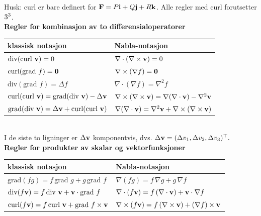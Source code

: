 Husk: curl er bare definert for $\mathbf{F}=P\mathbf{i}+Q\mathbf{j}+R\mathbf{k}$. Alle regler med curl forutsetter $3^3$.\\[1.25em]
\textbf{Regler for kombinasjon av to differensialoperatorer}\\[.25em]

\renewcommand{\arraystretch}{1.5}
\begin{tabular}{|l|l|}
\hline
 \textbf{klassisk notasjon} & \textbf{Nabla-notasjon} \\
\hline
 \( \text{div}(\text{curl } \mathbf{v}) = 0 \) & \( \nabla \cdot (\nabla \times \mathbf{v}) = 0 \) \\
 \( \text{curl}(\text{grad } f) = \mathbf{0} \) & \( \nabla \times (\nabla f) = \mathbf{0} \) \\
 \( \text{div}(\text{grad } f) = \Delta f \) & \( \nabla \cdot (\nabla f) = \nabla^2 f \) \\
 \( \text{curl}(\text{curl } \mathbf{v}) = \text{grad}(\text{div } \mathbf{v}) - \Delta \mathbf{v} \) & \( \nabla \times (\nabla \times \mathbf{v}) = \nabla(\nabla \cdot \mathbf{v}) - \nabla^2 \mathbf{v} \) \\
 \( \text{grad}(\text{div } \mathbf{v}) = \Delta \mathbf{v} + \text{curl}(\text{curl } \mathbf{v}) \) & \( \nabla(\nabla \cdot \mathbf{v}) = \nabla^2 \mathbf{v} + \nabla \times (\nabla \times \mathbf{v}) \) \\
\hline
\end{tabular}
\\[.25em]

I de siste to ligninger er $\Delta \mathbf{v}$ komponentvis, dvs. $\Delta \mathbf{v} = (\Delta v_1, \Delta v_2, \Delta v_3)^\top.$\\[.25em]

\textbf{Regler for produkter av skalar og vektorfunksjoner}\\[1em]
\begin{tabular}{|l|l|}
\hline
\textbf{klassisk notasjon} & \textbf{Nabla-notasjon} \\
\hline
 \( \text{grad}(f g) = f\, \text{grad } g + g\, \text{grad } f \) & \( \nabla(fg) = f\, \nabla g + g\, \nabla f \) \\
 \( \text{div}(f \mathbf{v}) = f\, \text{div } \mathbf{v} + \mathbf{v} \cdot \text{grad } f \) & \( \nabla \cdot (f \mathbf{v}) = f\, (\nabla \cdot \mathbf{v}) + \mathbf{v} \cdot \nabla f \) \\
 \( \text{curl}(f \mathbf{v}) = f\, \text{curl } \mathbf{v} + \text{grad } f \times \mathbf{v} \) & \( \nabla \times (f \mathbf{v}) = f\, (\nabla \times \mathbf{v}) + (\nabla f) \times \mathbf{v} \) \\
\hline
\end{tabular}
\\[.25em]

